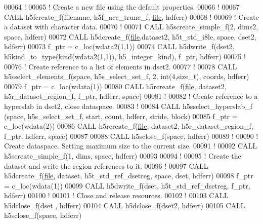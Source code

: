 \begin{DoxyCode}
00064   \textcolor{comment}{!}
00065   \textcolor{comment}{! Create a new file using the default properties.}
00066   \textcolor{comment}{!}
00067   \textcolor{keyword}{CALL }h5fcreate\_f(filename, h5f\_acc\_trunc\_f, \hyperlink{structfile}{file}, hdferr)
00068   \textcolor{comment}{!}
00069   \textcolor{comment}{! Create a dataset with character data.}
00070   \textcolor{comment}{!}
00071   \textcolor{keyword}{CALL }h5screate\_simple\_f(2, dims2, space, hdferr)
00072   \textcolor{keyword}{CALL }h5dcreate\_f(\hyperlink{structfile}{file},dataset2, h5t\_std\_i8le, space, dset2, hdferr)
00073   f\_ptr = c\_loc(wdata2(1,1))
00074   \textcolor{keyword}{CALL }h5dwrite\_f(dset2, h5kind\_to\_type(kind(wdata2(1,1)), h5\_integer\_kind), f\_ptr, hdferr)
00075   \textcolor{comment}{!}
00076   \textcolor{comment}{! Create reference to a list of elements in dset2.}
00077   \textcolor{comment}{!}
00078   \textcolor{keyword}{CALL }h5sselect\_elements\_f(space, h5s\_select\_set\_f, 2, int(4,size\_t), coords, hdferr)
00079   f\_ptr = c\_loc(wdata(1))
00080   \textcolor{keyword}{CALL }h5rcreate\_f(\hyperlink{structfile}{file}, dataset2, h5r\_dataset\_region\_f, f\_ptr, hdferr, space)
00081   \textcolor{comment}{!}
00082   \textcolor{comment}{! Create reference to a hyperslab in dset2, close dataspace.}
00083   \textcolor{comment}{!}
00084   \textcolor{keyword}{CALL }h5sselect\_hyperslab\_f (space, h5s\_select\_set\_f, start, count, hdferr, stride, block)
00085   f\_ptr = c\_loc(wdata(2))
00086   \textcolor{keyword}{CALL }h5rcreate\_f(\hyperlink{structfile}{file}, dataset2, h5r\_dataset\_region\_f, f\_ptr, hdferr, space)
00087 
00088   \textcolor{keyword}{CALL }h5sclose\_f(space, hdferr)
00089   \textcolor{comment}{!}
00090   \textcolor{comment}{! Create dataspace.  Setting maximum size to the current size.}
00091   \textcolor{comment}{!}
00092   \textcolor{keyword}{CALL }h5screate\_simple\_f(1, dims, space, hdferr)
00093 
00094   \textcolor{comment}{!}
00095   \textcolor{comment}{! Create the dataset and write the region references to it.}
00096   \textcolor{comment}{!}
00097   \textcolor{keyword}{CALL }h5dcreate\_f(\hyperlink{structfile}{file}, dataset, h5t\_std\_ref\_dsetreg, space, dset, hdferr)
00098   f\_ptr = c\_loc(wdata(1))
00099   \textcolor{keyword}{CALL }h5dwrite\_f(dset, h5t\_std\_ref\_dsetreg, f\_ptr, hdferr)
00100   \textcolor{comment}{!}
00101   \textcolor{comment}{! Close and release resources.}
00102   \textcolor{comment}{!}
00103   \textcolor{keyword}{CALL }h5dclose\_f(dset , hdferr)
00104   \textcolor{keyword}{CALL }h5dclose\_f(dset2, hdferr)
00105   \textcolor{keyword}{CALL }h5sclose\_f(space, hdferr)

\end{DoxyCode}
